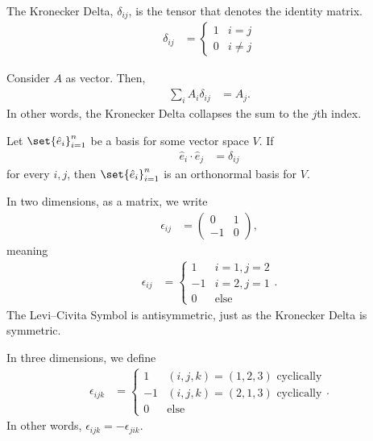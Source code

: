 \documentclass[10pt]{mypackage}
\begin{document}
\begin{definition}
  The Kronecker Delta, $\delta_{ij}$, is the tensor that denotes the identity matrix.
  \begin{align*}
    \delta_{ij} &= \begin{cases}
      1 & i=j\\
      0 & i\neq j
    \end{cases}
  \end{align*}
\end{definition}
\begin{example}
  Consider $A$ as vector. Then,
  \begin{align*}
    \sum_{i}A_i \delta_{ij} &= A_j.
  \end{align*}
  In other words, the Kronecker Delta collapses the sum to the $j$th index.
\end{example}
\begin{example}
  Let $\set{\hat{e}_i}_{i=1}^{n}$ be a basis for some vector space $V$. If
  \begin{align*}
    \hat{e}_i\cdot \hat{e}_j &= \delta_{ij}
  \end{align*}
  for every $i,j$, then $\set{\hat{e}_i}_{i=1}^{n}$ is an orthonormal basis for $V$.
\end{example}
\begin{definition}
  In two dimensions, as a matrix, we write
  \begin{align*}
    \epsilon_{ij} &= \begin{pmatrix}0 & 1 \\ -1 & 0\end{pmatrix},
  \end{align*}
  meaning
  \begin{align*}
    \epsilon_{ij} &= \begin{cases}
      1 & i=1,j=2\\
      -1 & i=2,j=1\\
      0 & \text{else}
    \end{cases}.
  \end{align*}
  The Levi--Civita Symbol is antisymmetric, just as the Kronecker Delta is symmetric.\newline

  In three dimensions, we define
  \begin{align*}
    \epsilon_{ijk}  &= \begin{cases}
      1 & \text{$\left(i,j,k\right) = \left(1,2,3\right)$ cyclically}\\
      -1 & \text{$\left(i,j,k\right) = \left(2,1,3\right)$ cyclically}\\
      0 & \text{else}
    \end{cases}.
  \end{align*}
  In other words, $\epsilon_{ijk} = -\epsilon_{jik}$.
\end{definition}
\end{document}
